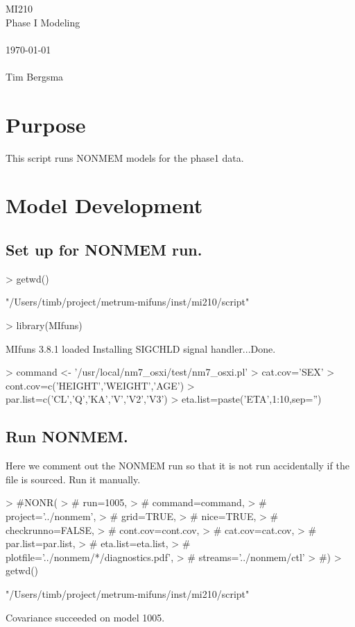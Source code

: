 
\usepackage{Sweave}

 

\vspace*{2cm}
\begin{center}
{\Huge MI210}\\
\vspace{1.5cm}
{\Large Phase I Modeling}\\
~\\
\today\\
~\\
Tim Bergsma\\
\end{center}
\newpage

\section{Purpose}
This script runs NONMEM models for the phase1 data.
\section{Model Development}
\subsection{Set up for NONMEM run.}
\begin{Schunk}
\begin{Sinput}
> getwd()
\end{Sinput}
\begin{Soutput}
[1] "/Users/timb/project/metrum-mifuns/inst/mi210/script"
\end{Soutput}
\begin{Sinput}
> library(MIfuns)
\end{Sinput}
\begin{Soutput}
MIfuns 3.8.1 loaded
Installing SIGCHLD signal handler...Done.
\end{Soutput}
\begin{Sinput}
> command <- '/usr/local/nm7_osxi/test/nm7_osxi.pl'
> cat.cov='SEX'
> cont.cov=c('HEIGHT','WEIGHT','AGE')
> par.list=c('CL','Q','KA','V','V2','V3')
> eta.list=paste('ETA',1:10,sep='')
\end{Sinput}
\end{Schunk}
\subsection{Run NONMEM.}
Here we comment out the NONMEM run so that it is not run accidentally 
if the file is sourced.  Run it manually.
\begin{Schunk}
\begin{Sinput}
> #NONR(
> #     run=1005,
> #     command=command,
> #     project='../nonmem',
> #     grid=TRUE,
> #     nice=TRUE,
> #     checkrunno=FALSE,
> #     cont.cov=cont.cov,
> #     cat.cov=cat.cov,
> #     par.list=par.list,
> #     eta.list=eta.list,
> #     plotfile='../nonmem/*/diagnostics.pdf',
> #     streams='../nonmem/ctl'
> #)
> getwd()
\end{Sinput}
\begin{Soutput}
[1] "/Users/timb/project/metrum-mifuns/inst/mi210/script"
\end{Soutput}
\end{Schunk}
Covariance succeeded on model 1005.
